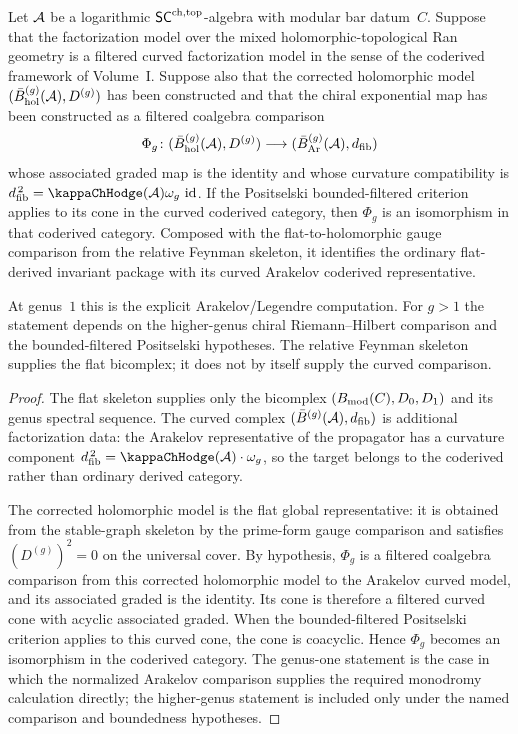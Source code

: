\begin{theorem}
\label{thm:derived-coderived-full}
Let $\mathcal{A}$ be a logarithmic $\mathsf{SC}^{\mathrm{ch,top}}$-algebra with modular bar
datum~$C$. Suppose that the factorization model over the mixed
holomorphic-topological Ran geometry is a filtered curved
factorization model in the sense of the coderived framework of
Volume~I. Suppose also that the corrected holomorphic model
$(\bar{B}_{\mathrm{hol}}^{(g)}(\mathcal{A}),D^{(g)})$ has been constructed
and that the chiral exponential map has been constructed as a
filtered coalgebra comparison
\[
\Phi_g\colon
(\bar{B}_{\mathrm{hol}}^{(g)}(\mathcal{A}),D^{(g)})
\longrightarrow
(\bar{B}_{\mathrm{Ar}}^{(g)}(\mathcal{A}),d_{\mathrm{fib}})
\]
whose associated graded map is the identity and whose curvature
compatibility is
$\dfib^{\,2}=\kappaChHodge(\cA)\omega_g\,\id$. If the Positselski
bounded-filtered criterion applies to its cone in the curved
coderived category, then $\Phi_g$ is an isomorphism in that
coderived category. Composed with the flat-to-holomorphic gauge
comparison from the relative Feynman skeleton, it identifies the
ordinary flat-derived invariant package with its curved Arakelov
coderived representative.

At genus~$1$ this is the explicit Arakelov/Legendre computation.
For $g>1$ the statement depends on the higher-genus chiral
Riemann--Hilbert comparison and the bounded-filtered Positselski
hypotheses. The relative Feynman skeleton supplies the flat
bicomplex; it does not by itself supply the curved comparison.
\end{theorem}

\begin{proof}
The flat skeleton supplies only the bicomplex
$(B_{\mathrm{mod}}(C),D_0,D_1)$ and its genus spectral sequence. The
curved complex $(\bar{B}^{(g)}(\mathcal{A}),d_{\mathrm{fib}})$ is additional
factorization data: the Arakelov representative of the
propagator has a curvature component
$\dfib^{\,2}=\kappaChHodge(\cA)\cdot\omega_g$, so the target belongs
to the coderived rather than ordinary derived category.

The corrected holomorphic model is the flat global representative:
it is obtained from the stable-graph skeleton by the prime-form
gauge comparison and satisfies $(D^{(g)})^2=0$ on the universal
cover. By hypothesis, $\Phi_g$ is a filtered coalgebra comparison
from this corrected holomorphic model to the Arakelov curved model,
and its associated graded is the identity. Its cone is therefore a
filtered curved cone with acyclic associated graded. When the
bounded-filtered Positselski criterion applies to this curved cone,
the cone is coacyclic. Hence $\Phi_g$ becomes an isomorphism in the
coderived category. The genus-one statement is the case in which
the normalized Arakelov comparison supplies the required monodromy
calculation directly; the higher-genus statement is included only
under the named comparison and boundedness hypotheses.
\end{proof}

